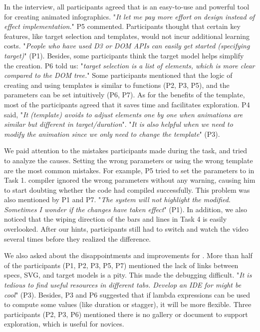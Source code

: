 In the interview, all participants agreed that \gaia{} is an easy-to-use and powerful tool for creating animated infographics.
"\textit{It let me pay more effort on design instead of effect implementation.}" P5 commented.
Participants thought that certain key features, like target selection and templates, would not incur additional learning costs.
"\textit{People who have used D3 or DOM APIs can easily get started (specifying target)}" (P1). 
Besides, some participants think the target model helps simplify the creation.
P6 told us: "\textit{target selection is a list of elements, which is more clear compared to the DOM tree.}"
Some participants mentioned that the logic of creating and using templates is similar to functions (P2, P3, P5), and the parameters can be set intuitively (P6, P7).
As for the benefits of the template, most of the participants agreed that it saves time and facilitates exploration.
P4 said, "\textit{It (template) avoids to adjust elements one by one when animations are similar but different in target/duration}".
"\textit{It is also helpful when we need to modify the animation since we only need to change the template}" (P3).

We paid attention to the mistakes participants made during the task, and tried to analyze the causes.
Setting the wrong parameters or using the wrong template are the most common mistakes.
For example, P5 tried to set the  parameters to  in Task 1.
\gaia{} compiler ignored the wrong parameters without any warning, causing him to start doubting whether the code had compiled successfully.
This problem was also mentioned by P1 and P7. "\textit{The system will not highlight the modified. Sometimes I wonder if the changes have taken effect}" (P1).
In addition, we also noticed that the wiping direction of the bars and lines in Task 4 is easily overlooked.
After our hints, participants still had to switch and watch the video several times before they realized the difference.

We also asked about the disappointments and improvements for \gaia{}.
More than half of the participants (P1, P2, P3, P5, P7) mentioned the lack of links between specs, SVG, and target models is a pity.
This made the debugging difficult.
"\textit{It is tedious to find useful resources in different tabs. Develop an IDE for \gaia{} might be cool}" (P3).
Besides, P3 and P6 suggested that if lambda expressions can be used to compute some values (like duration or stagger), it will be more flexible.
Three participants (P2, P3, P6) mentioned there is no gallery or document to support exploration, which is useful for novices.


